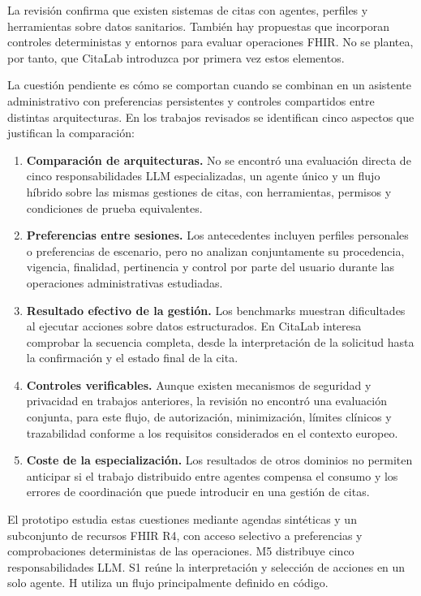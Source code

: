 La revisión confirma que existen sistemas de citas con agentes, perfiles y herramientas sobre datos sanitarios. También hay propuestas que incorporan controles deterministas y entornos para evaluar operaciones FHIR. No se plantea, por tanto, que CitaLab introduzca por primera vez estos elementos.

La cuestión pendiente es cómo se comportan cuando se combinan en un asistente administrativo con preferencias persistentes y controles compartidos entre distintas arquitecturas. En los trabajos revisados se identifican cinco aspectos que justifican la comparación:

\begin{enumerate}
\item \textbf{Comparación de arquitecturas.} No se encontró una evaluación directa de cinco responsabilidades LLM especializadas, un agente único y un flujo híbrido sobre las mismas gestiones de citas, con herramientas, permisos y condiciones de prueba equivalentes.
\item \textbf{Preferencias entre sesiones.} Los antecedentes incluyen perfiles personales o preferencias de escenario, pero no analizan conjuntamente su procedencia, vigencia, finalidad, pertinencia y control por parte del usuario durante las operaciones administrativas estudiadas.
\item \textbf{Resultado efectivo de la gestión.} Los benchmarks muestran dificultades al ejecutar acciones sobre datos estructurados. En CitaLab interesa comprobar la secuencia completa, desde la interpretación de la solicitud hasta la confirmación y el estado final de la cita.
\item \textbf{Controles verificables.} Aunque existen mecanismos de seguridad y privacidad en trabajos anteriores, la revisión no encontró una evaluación conjunta, para este flujo, de autorización, minimización, límites clínicos y trazabilidad conforme a los requisitos considerados en el contexto europeo.
\item \textbf{Coste de la especialización.} Los resultados de otros dominios no permiten anticipar si el trabajo distribuido entre agentes compensa el consumo y los errores de coordinación que puede introducir en una gestión de citas.
\end{enumerate}

El prototipo estudia estas cuestiones mediante agendas sintéticas y un subconjunto de recursos FHIR R4, con acceso selectivo a preferencias y comprobaciones deterministas de las operaciones. M5 distribuye cinco responsabilidades LLM. S1 reúne la interpretación y selección de acciones en un solo agente. H utiliza un flujo principalmente definido en código.

